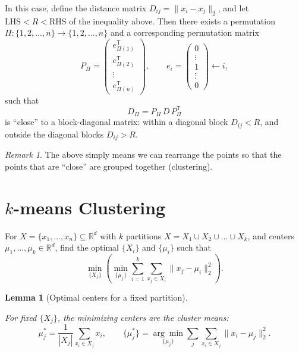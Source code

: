 \documentclass[
  letterpaper,
  DIV=11,
  numbers=noendperiod]{scrreprt}
\theoremstyle{definition}
\theoremstyle{plain}
\theoremstyle{plain}
\theoremstyle{definition}
\theoremstyle{plain}
\theoremstyle{plain}
\newtheorem{lemma}{Lemma}[chapter]
\theoremstyle{remark}
\newtheorem*{remark}{Remark}
\begin{document}
In this case, define the distance matrix \(D_{ij} = \|x_i - x_j\|_2\),
and let \(\text{LHS} < R < \text{RHS}\) of the inequality above. Then
there exists a permutation
\(\Pi : \{1, 2, \dots, n\} \to \{1, 2, \dots, n\}\) and a corresponding
permutation matrix \[
P_\Pi = \begin{pmatrix} e_{\Pi(1)}^{\mathsf T} \\ e_{\Pi(2)}^{\mathsf T} \\ \vdots \\ e_{\Pi(n)}^{\mathsf T} \end{pmatrix},
\qquad
e_i = \begin{pmatrix} 0 \\ \vdots \\ 1 \\ \vdots \\ 0 \end{pmatrix} \leftarrow i,
\] such that \[
D_\Pi = P_\Pi\, D\, P_\Pi^{\mathsf T}
\] is ``close'' to a block-diagonal matrix: within a diagonal block
\(D_{ij} < R\), and outside the diagonal blocks \(D_{ij} > R\).

\begin{remark}
The above simply means we can rearrange the points so that the points
that are ``close'' are grouped together (clustering).
\end{remark}

\section{\texorpdfstring{\(k\)-means
Clustering}{k-means Clustering}}\label{k-means-clustering}

For \(X = \{x_1, \dots, x_n\} \subseteq \mathbb{R}^d\) with \(k\)
partitions \(X = X_1 \cup X_2 \cup \dots \cup X_k\), and centers
\(\mu_1, \dots, \mu_k \in \mathbb{R}^d\), find the optimal \(\{X_i\}\)
and \(\{\mu_i\}\) such that \[
\min_{\{X_j\}} \left( \min_{\{\mu_j\}} \sum_{i=1}^{k} \sum_{x_j \in X_i} \|x_j - \mu_i\|_2^2 \right).
\]

\begin{lemma}[Optimal centers for a fixed
partition]\protect\hypertarget{lem-kmeans-center}{}\label{lem-kmeans-center}

For fixed \(\{X_j\}\), the minimizing centers are the cluster means: \[
\mu_j^* = \frac{1}{|X_j|} \sum_{x_i \in X_j} x_i,
\qquad
\{\mu_j^*\} = \underset{\{\mu_j\}}{\arg\min} \sum_{j} \sum_{x_i \in X_j} \|x_i - \mu_j\|_2^2 .
\]

\end{lemma}
\end{document}
